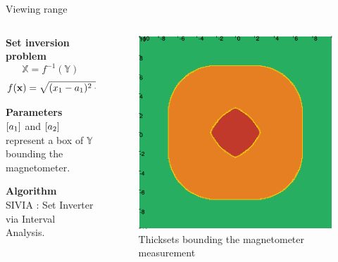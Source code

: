 \begin{frame}{Viewing range}
    \begin{columns}

        \begin{column}{0.5\textwidth}
            \textbf{Set inversion problem}
            $$\mathbb{X} = f^{-1}(\mathbb{Y})$$
            $$f(\mathbf{x}) = \sqrt{(\mathnormal{x}_1-\mathnormal{a}_1)^2 + (\mathnormal{x}_2-\mathnormal{a}_2)^2}$$

            \vspace{0.5cm}
            \textbf{Parameters} \\
            $[\mathnormal{a}_1]$ and $[\mathnormal{a}_2]$ represent a box of $\mathbb{Y}$ bounding the magnetometer.
            
            \vspace{0.5cm}
            \textbf{Algorithm} \\
            SIVIA : Set  Inverter  via  Interval  Analysis.
        \end{column}

        \begin{column}{0.5\textwidth}
            \begin{figure}
                \centering
                \includegraphics[width=\textwidth]{images/Thicksets/thickset.png}
                \caption{Thicksets bounding the magnetometer measurement}
            \end{figure}
        \end{column}
    \end{columns}
\end{frame}
